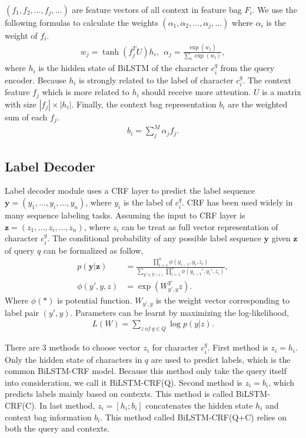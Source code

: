 $(f_1, f_2, \ldots, f_j, \ldots)$ are feature vectors of all context in feature bag $F_i$. We use the following formulas to calculate the weights $(\alpha_1, \alpha_2, \ldots, \alpha_j, \ldots)$ where $\alpha_i$ is the weight of $f_i$.
\begin{align*}
	w_j = \tanh(f_j^TU)h_i, \ \ \alpha_j = \frac{\exp{(w_j)}}{\sum_t \exp{(w_t)}},
\end{align*}
where $h_i$ is the hidden state of BiLSTM of the character $c_i^q$ from the query encoder. Because $h_i$ is strongly related to the label of character $c_i^q$. The context feature $f_j$ which is more related to $h_i$ should receive more attention. $U$ is a matrix with size $|f_j| \times |h_i|$.  Finally, the context bag representation $b_i$ are the weighted sum of each $f_j$.
\begin{align*}
	b_i = \sum_j^M \alpha_j f_j.
\end{align*}


\subsection{Label Decoder}
Label decoder module uses a CRF layer to predict the label sequence $\bm{y} = (y_1,  \ldots, y_i, \ldots, y_n)$, where $y_i$ is the label of $c_i^q$. CRF has been used widely in many sequence labeling tasks. Assuming the input to CRF layer is $\bm{z} = (z_1, \ldots, z_i, \ldots, z_n)$, where $z_i$ can be treat as full vector representation of character $c_i^q$. The conditional probability of any possible label sequence $\bm{y}$ given $\bm{z}$ of query $q$ can be formalized as follow,
\begin{align*}
	p(\bm{y} | \bm{z}) & = \frac{\prod_{i=1}^n \phi(y_{i-1}, y_i, z_i)} {\sum_{y' \in \mathcal{Y}(z)}\prod_{i=1}^n \phi(y_{i-1}', y_i', z_i)}, \\
	\phi(y', y, z)     & = \exp(W_{y', y}^T z).
\end{align*}
Where $\phi(*)$ is potential function. $W_{y', y}$ is the weight vector corresponding to label pair $(y', y)$. Parameters can be learnt by maximizing the log-likelihood,
\begin{align*}
	L(W) = \sum_{z \ of \ q \in Q} \log p(y|z).
\end{align*}

There are 3 methods to choose vector $z_i$ for character $c_i^q$. First method is $z_i = h_i$. Only the hidden state of characters in $q$ are used to predict labels, which is the common BiLSTM-CRF model. Because this method only take the query itself into consideration, we call it BiLSTM-CRF(Q). Second method is $z_i = b_i$, which predicts labels mainly based on contexts. This method is called BiLSTM-CRF(C). In last method, $z_i = [h_i; b_i]$ concatenates the hidden state $h_i$ and context bag information $b_i$. This method called BiLSTM-CRF(Q+C) relies on both the query and contexts.

